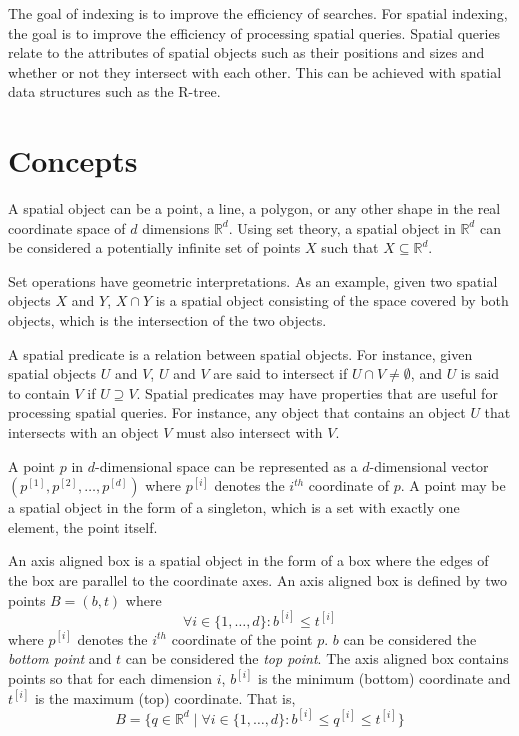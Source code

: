 The goal of indexing is to improve the efficiency of searches. For spatial indexing, the goal is to improve the efficiency of processing spatial queries. Spatial queries relate to the attributes of spatial objects such as their positions and sizes and whether or not they intersect with each other. This can be achieved with spatial data structures such as the R-tree.

\section{Concepts}

A spatial object can be a point, a line, a polygon, or any other shape in the real coordinate space of \(d\) dimensions \(\mathbb{R}^d\). Using set theory, a spatial object in \(\mathbb{R}^d\) can be considered a potentially infinite set of points \(X\) such that \(X \subseteq \mathbb{R}^d\).

Set operations have geometric interpretations. As an example, given two spatial objects \(X\) and \(Y\), \(X \cap Y\) is a spatial object consisting of the space covered by both objects, which is the intersection of the two objects.

A spatial predicate is a relation between spatial objects. For instance, given spatial objects \(U\) and \(V\), \(U\) and \(V\) are said to intersect if \(U \cap V \neq \emptyset\), and \(U\) is said to contain \(V\) if \(U \supseteq V\). Spatial predicates may have properties that are useful for processing spatial queries. For instance, any object that contains an object \(U\) that intersects with an object \(V\) must also intersect with \(V\).

A point \(p\) in \(d\)-dimensional space can be represented as a \(d\)-dimensional vector \((p^{[1]}, p^{[2]}, \dotsc, p^{[d]})\) where \(p^{[i]}\) denotes the \(i^{th}\) coordinate of \(p\). A point may be a spatial object in the form of a singleton, which is a set with exactly one element, the point itself.

An axis aligned box is a spatial object in the form of a box where the edges of the box are parallel to the coordinate axes. An axis aligned box is defined by two points \(B = (b, t)\) where
\[
  \forall i \in \{1, \dotsc, d\} :
  b^{[i]} \leq t^{[i]}
\]
where \(p^{[i]}\) denotes the \(i^{th}\) coordinate of the point \(p\). \(b\) can be considered the \emph{bottom point} and \(t\) can be considered the \emph{top point}. The axis aligned box contains points so that for each dimension \(i\), \(b^{[i]}\) is the minimum (bottom) coordinate and \(t^{[i]}\) is the maximum (top) coordinate. That is,
\[
  B = \{
    q \in \mathbb{R}^d \mid
    \forall i \in \{ 1, \dotsc, d \} :
    b^{[i]} \leq q^{[i]} \leq t^{[i]}
  \}
\]

